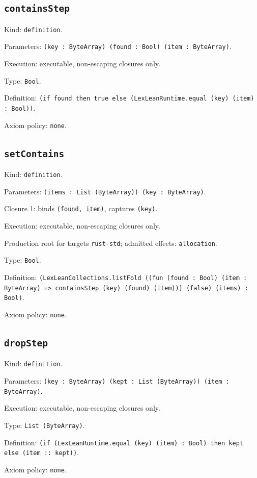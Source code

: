 \documentclass[11pt]{article}
\begin{document}
\subsection*{\texttt{containsStep}}
\noindent Kind: \texttt{definition}.\par
\noindent Parameters: \texttt{(key : ByteArray) (found : Bool) (item : ByteArray)}.\par
\noindent Execution: executable, non-escaping closures only.\par
\noindent Type: \texttt{Bool}.\par
\noindent Definition: \texttt{(if found then true else (LexLeanRuntime.equal (key) (item) : Bool))}.\par
\noindent Axiom policy: \texttt{none}.\par
\subsection*{\texttt{setContains}}
\noindent Kind: \texttt{definition}.\par
\noindent Parameters: \texttt{(items : List (ByteArray)) (key : ByteArray)}.\par
\noindent Closure 1: binds \texttt{(found, item)}, captures \texttt{(key)}.\par
\noindent Execution: executable, non-escaping closures only.\par
\noindent Production root for targets \texttt{rust-std}; admitted effects: \texttt{allocation}.\par
\noindent Type: \texttt{Bool}.\par
\noindent Definition: \texttt{(LexLeanCollections.listFold ((fun (found : Bool) (item : ByteArray) => containsStep (key) (found) (item))) (false) (items) : Bool)}.\par
\noindent Axiom policy: \texttt{none}.\par
\subsection*{\texttt{dropStep}}
\noindent Kind: \texttt{definition}.\par
\noindent Parameters: \texttt{(key : ByteArray) (kept : List (ByteArray)) (item : ByteArray)}.\par
\noindent Execution: executable, non-escaping closures only.\par
\noindent Type: \texttt{List (ByteArray)}.\par
\noindent Definition: \texttt{(if (LexLeanRuntime.equal (key) (item) : Bool) then kept else (item :: kept))}.\par
\noindent Axiom policy: \texttt{none}.\par
\end{document}
